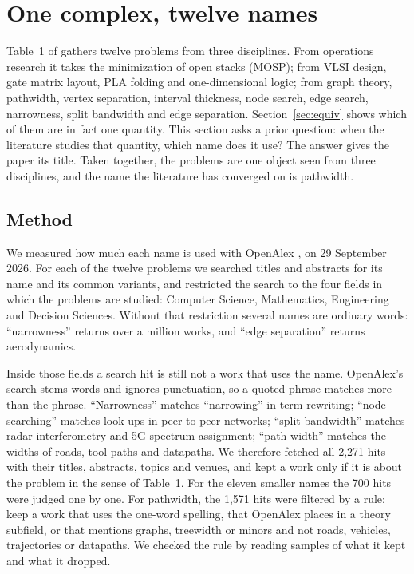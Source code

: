 \section{One complex, twelve names}
\label{sec:names}

Table~1 of \citet{LY2002} gathers twelve problems from three disciplines. From
operations research it takes the minimization of open stacks (MOSP); from VLSI
design, gate matrix layout, PLA folding and one-dimensional logic; from graph
theory, pathwidth, vertex separation, interval thickness, node search, edge
search, narrowness, split bandwidth and edge separation. Section~\ref{sec:equiv}
shows which of them are in fact one quantity. This section asks a prior
question: when the literature studies that quantity, which name does it use?
The answer gives the paper its title. Taken together, the problems are one
object seen from three disciplines, and the name the literature has converged
on is pathwidth.

\subsection{Method}
\label{sec:names-method}

We measured how much each name is used with OpenAlex \citep{Priem2022}, on
29 September 2026. For each of the twelve problems we searched titles and
abstracts for its name and its common variants, and restricted the search to
the four fields in which the problems are studied: Computer Science,
Mathematics, Engineering and Decision Sciences. Without that restriction
several names are ordinary words: ``narrowness'' returns over a million works,
and ``edge separation'' returns aerodynamics.

Inside those fields a search hit is still not a work that uses the name.
OpenAlex's search stems words and ignores punctuation, so a quoted phrase
matches more than the phrase. ``Narrowness'' matches ``narrowing'' in term
rewriting; ``node searching'' matches look-ups in peer-to-peer networks;
``split bandwidth'' matches radar interferometry and 5G spectrum assignment;
``path-width'' matches the widths of roads, tool paths and datapaths. We
therefore fetched all 2,271 hits with their titles, abstracts, topics and
venues, and kept a work only if it is about the problem in the sense of
Table~1. For the eleven smaller names the 700 hits were judged one by one. For
pathwidth, the 1,571 hits were filtered by a rule: keep a work that uses the
one-word spelling, that OpenAlex places in a theory subfield, or that mentions
graphs, treewidth or minors and not roads, vehicles, trajectories or datapaths.
We checked the rule by reading samples of what it kept and what it dropped.


